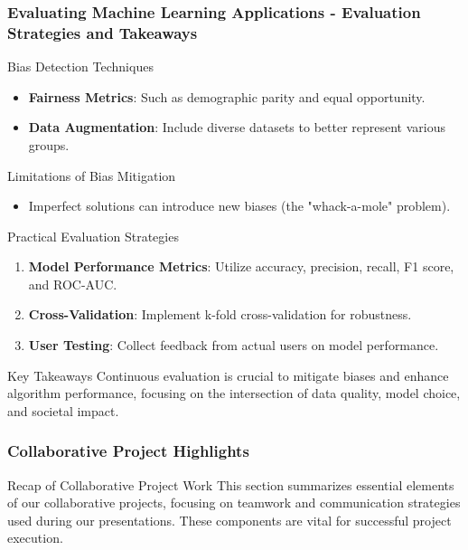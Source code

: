 \documentclass[aspectratio=169]{beamer}
\begin{document}
\begin{frame}[fragile]
    \frametitle{Evaluating Machine Learning Applications - Evaluation Strategies and Takeaways}
    \begin{block}{Bias Detection Techniques}
        \begin{itemize}
            \item \textbf{Fairness Metrics}: Such as demographic parity and equal opportunity.
            \item \textbf{Data Augmentation}: Include diverse datasets to better represent various groups.
        \end{itemize}
    \end{block}

    \begin{block}{Limitations of Bias Mitigation}
        \begin{itemize}
            \item Imperfect solutions can introduce new biases (the "whack-a-mole" problem).
        \end{itemize}
    \end{block}

    \begin{block}{Practical Evaluation Strategies}
        \begin{enumerate}
            \item \textbf{Model Performance Metrics}: Utilize accuracy, precision, recall, F1 score, and ROC-AUC.
            \item \textbf{Cross-Validation}: Implement k-fold cross-validation for robustness.
            \item \textbf{User Testing}: Collect feedback from actual users on model performance.
        \end{enumerate}
    \end{block}

    \begin{block}{Key Takeaways}
        Continuous evaluation is crucial to mitigate biases and enhance algorithm performance, focusing on the intersection of data quality, model choice, and societal impact.
    \end{block}
\end{frame}

\begin{frame}[fragile]
    \frametitle{Collaborative Project Highlights}
    \begin{block}{Recap of Collaborative Project Work}
        This section summarizes essential elements of our collaborative projects, focusing on teamwork and communication strategies used during our presentations. These components are vital for successful project execution.
    \end{block}
\end{frame}
\end{document}

